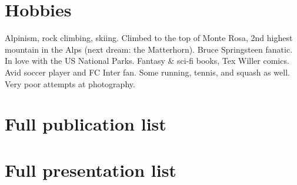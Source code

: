 \section{Hobbies}
Alpinism, rock climbing, skiing. Climbed to the top of Monte Rosa, 2nd highest mountain in the Alps (next dream: the Matterhorn). Bruce Springsteen fanatic. In love with the US National Parks. Fantasy \& sci-fi books, Tex Willer comics. Avid soccer player and FC Inter fan. Some running, tennis, and squash as well.  Very poor attempts at photography.

\pagebreak
\section{Full publication list}\vspace{0.2cm} 



\section{Full presentation list}\vspace{0.2cm} 




